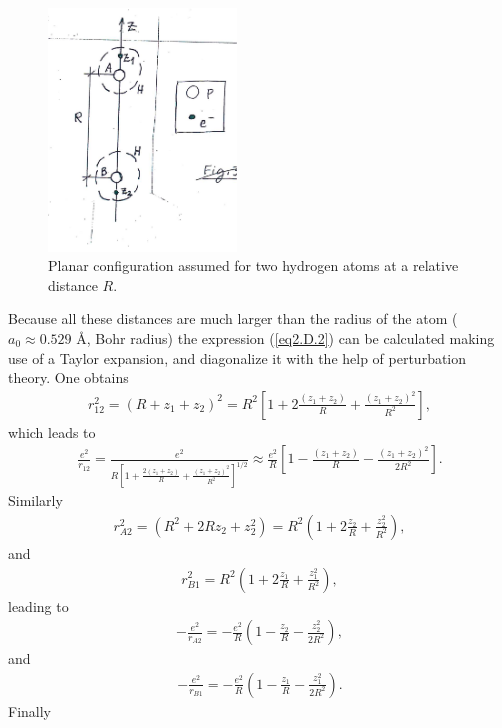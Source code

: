 \begin{subappendices}
    \begin{figure}
     \centerline{\includegraphics*[width=5cm,angle=0]{nutshell/figs/fig2D4.pdf}}
     \caption{Planar configuration assumed for two hydrogen atoms at a relative distance $R$.}\label{fig2.D.4}
     \end{figure}
Because all these distances are much larger than the radius of the atom ($a_0\approx0.529$ \AA, Bohr radius) the expression (\ref{eq2.D.2}) can be calculated making use of a Taylor expansion, and diagonalize it with the help of perturbation theory. One obtains
\begin{align}\label{eq2.D.4}
r_{12}^2=(R+z_1+z_2)^2=R^2\left[1+2\frac{(z_1+z_2)}{R}+\frac{(z_1+z_2)^2}{R^2}\right],
\end{align}
which leads to 
\begin{align}\label{eq2.D.5}
\frac{e^2}{r_{12}}=\frac{e^2}{R\left[1+\frac{2(z_1+z_2)}{R}+\frac{(z_1+z_2)^2}{R^2}\right]^{1/2}}\approx\frac{e^2}{R}\left[1-\frac{(z_1+z_2)}{R}-\frac{(z_1+z_2)^2}{2R^2}\right].
\end{align}
 Similarly
\begin{align}\label{eq2.D.6}
r^2_{A2}=\left(R^2+2Rz_2+z_2^2\right)=R^2\left(1+2\frac{z_2}{R}+\frac{z_2^2}{R^2}\right),
\end{align}
and
\begin{align}\label{eq2.D.7}
r^2_{B1}=R^2\left(1+2\frac{z_1}{R}+\frac{z_1^2}{R^2}\right),
\end{align}
leading to
\begin{align}\label{eq2.D.8}
-\frac{e^2}{r_{A2}}=-\frac{e^2}{R}\left(1-\frac{z_2}{R}-\frac{z_2^2}{2R^2}\right),
\end{align}
and
\begin{align}\label{eq2.D.9}
-\frac{e^2}{r_{B1}}=-\frac{e^2}{R}\left(1-\frac{z_1}{R}-\frac{z_1^2}{2R^2}\right).
\end{align}
Finally
\begin{align}\label{eq2.D.10}

\end{align}
\end{subappendices}
